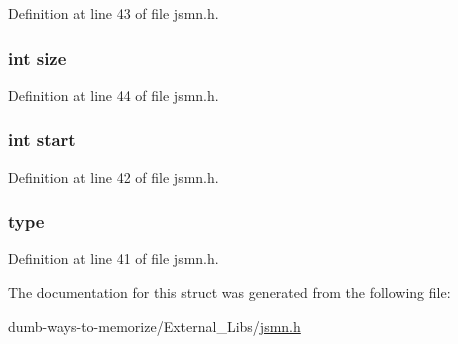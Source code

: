 Definition at line 43 of file jsmn.\+h.

\subsubsection[{\texorpdfstring{size}{size}}]{\setlength{\rightskip}{0pt plus 5cm}int size}\hypertarget{structjsmntok__t_a439227feff9d7f55384e8780cfc2eb82}{}\label{structjsmntok__t_a439227feff9d7f55384e8780cfc2eb82}


Definition at line 44 of file jsmn.\+h.

\subsubsection[{\texorpdfstring{start}{start}}]{\setlength{\rightskip}{0pt plus 5cm}int start}\hypertarget{structjsmntok__t_a37722a150250e2a5a98e5e0d11e53449}{}\label{structjsmntok__t_a37722a150250e2a5a98e5e0d11e53449}


Definition at line 42 of file jsmn.\+h.

\subsubsection[{\texorpdfstring{type}{type}}]{ type}\hypertarget{structjsmntok__t_a7def41ebc3980f6e4526819b42c2721f}{}\label{structjsmntok__t_a7def41ebc3980f6e4526819b42c2721f}


Definition at line 41 of file jsmn.\+h.



The documentation for this struct was generated from the following file\+:\begin{DoxyCompactItemize}
\item 
dumb-\/ways-\/to-\/memorize/\+External\+\_\+\+Libs/\hyperlink{jsmn_8h}{jsmn.\+h}\end{DoxyCompactItemize}

